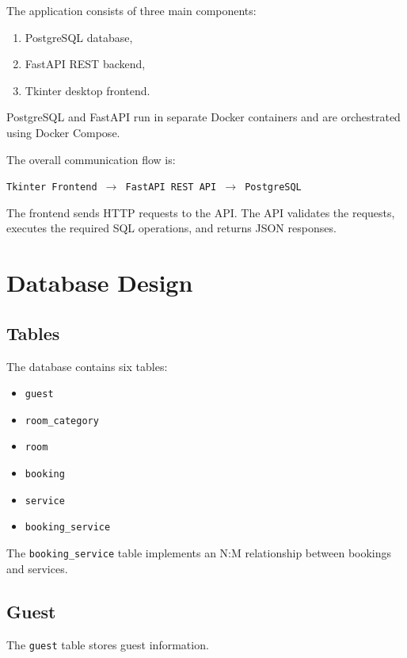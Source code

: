 \documentclass[12pt,a4paper]{article}
\begin{document}
The application consists of three main components:

\begin{enumerate}
    \item PostgreSQL database,
    \item FastAPI REST backend,
    \item Tkinter desktop frontend.
\end{enumerate}

PostgreSQL and FastAPI run in separate Docker containers and are
orchestrated using Docker Compose.

The overall communication flow is:

\begin{center}
\texttt{Tkinter Frontend $\rightarrow$ FastAPI REST API $\rightarrow$ PostgreSQL}
\end{center}

The frontend sends HTTP requests to the API. The API validates the
requests, executes the required SQL operations, and returns JSON
responses.

\section{Database Design}

\subsection{Tables}

The database contains six tables:

\begin{itemize}
    \item \texttt{guest}
    \item \texttt{room\_category}
    \item \texttt{room}
    \item \texttt{booking}
    \item \texttt{service}
    \item \texttt{booking\_service}
\end{itemize}

The \texttt{booking\_service} table implements an N:M relationship
between bookings and services.

\subsection{Guest}

The \texttt{guest} table stores guest information.
\end{document}
